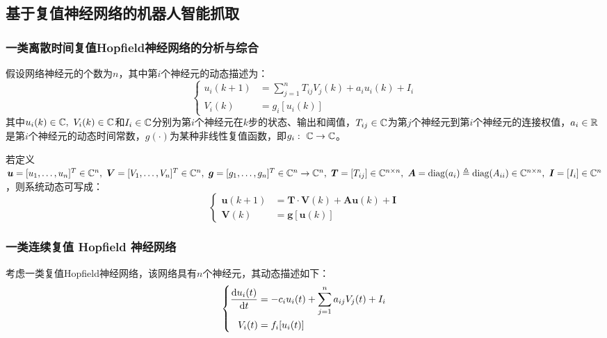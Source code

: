\documentclass[no-math, withoutpreface]{YangThesis}
\begin{document}
\subsection{基于复值神经网络的机器人智能抓取}

\subsubsection{一类离散时间复值Hopf\/ield神经网络的分析与综合}

假设网络神经元的个数为$n$，其中第$i$个神经元的动态描述为：
\begin{equation}
\left\{
\begin{aligned}
	u_i(k+1)&=\sum\limits_{j=1}^nT_{ij}V_{j}(k)+a_iu_i(k)+I_i\\
	V_i(k)&=g_i[u_i(k)]
\end{aligned}
\right.
\end{equation}
其中$u_i(k)\in \mathbb{C},\ V_i(k)\in \mathbb{C}$和$I_i\in\mathbb{C}$分别为第$i$个神经元在$k$步的状态、输出和阈值，$T_{ij}\in\mathbb{C}$为第$j$个神经元到第$i$个神经元的连接权值，$a_i\in\mathbb{R}$是第$i$个神经元的动态时间常数，$g(\cdot)$为某种非线性复值函数，即$g_i:\ \mathbb{C}\rightarrow\mathbb{C}$。

若定义${\bm u}=[u_1,\ldots,u_n]^T\in\mc^n,\ {\bm V}=[V_1,\ldots,V_n]^T\in\mc^n,\ {\bm g}=[g_1,\ldots,g_n]^T\in\mc^n\rightarrow\mc^n,\ {\bm T}
=[T_{ij}]\in\mc^{n\times n},\ {\bm A}=\diag(a_i)\triangleq \diag(A_{ii})
\in\mc^{n\times n},\ {\bm I}=[I_{i}]\in\mc^{n}$，则系统动态可写成：
\begin{equation}
\left\{
\begin{aligned}
	{\bm u}(k+1)&={\bm T}\cdot{\bm V}(k)+{\bm A}{\bm u}(k)+{\bm I}\\
	{\bm V}(k)&={\bm g}[{\bm u}(k)]
\end{aligned}
\right.
\end{equation}

\subsubsection{一类连续复值 Hopf\/ield 神经网络}

考虑一类复值Hopf\/ield神经网络，该网络具有$n$个神经元，其动态描述如下：
\begin{equation}
\left\{
\begin{aligned}
	\frac{\mathrm{d} u_i(t)}{\mathrm{d} t}&=-c_iu_i(t)+\sum\limits_{j=1}^na_{ij}V_{j}(t)+I_i\\
	V_i(t)&=f_i[u_i(t)]
\end{aligned}
\right.
\end{equation}
\end{document}
